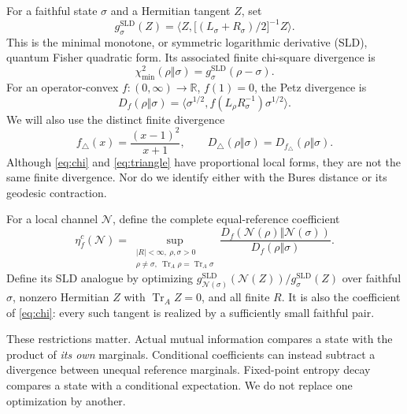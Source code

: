 \documentclass[11pt]{article}
\newcommand{\Tr}{\operatorname{Tr}}
\newcommand{\N}{\mathcal N}
\newcommand{\ip}[2]{\langle #1,#2\rangle}
\newcommand{\Dtri}{D_{\triangle}}
\newcommand{\gmin}{g^{\mathrm{SLD}}}
\theoremstyle{remark}
\begin{document}
For a faithful state \(\sigma\) and a Hermitian tangent \(Z\), set
\begin{equation}\label{eq:sld}
 \gmin_\sigma(Z)=
 \ip{Z}{\bigl[(L_\sigma+R_\sigma)/2\bigr]^{-1}Z}.
\end{equation}
This is the minimal monotone, or symmetric logarithmic derivative (SLD), quantum Fisher quadratic form. Its associated finite chi-square divergence is
\begin{equation}\label{eq:chi}
 \chi^2_{\min}(\rho\Vert\sigma)=\gmin_\sigma(\rho-\sigma).
\end{equation}
For an operator-convex \(f:(0,\infty)\to\mathbb R\), \(f(1)=0\), the Petz divergence is
\begin{equation}\label{eq:petz}
 D_f(\rho\Vert\sigma)=
 \ip{\sigma^{1/2}}{f(L_\rho R_\sigma^{-1})\sigma^{1/2}}.
\end{equation}
We will also use the distinct finite divergence
\begin{equation}\label{eq:triangle}
 f_\triangle(x)=\frac{(x-1)^2}{x+1},\qquad
 \Dtri(\rho\Vert\sigma)=D_{f_\triangle}(\rho\Vert\sigma).
\end{equation}
Although \eqref{eq:chi} and \eqref{eq:triangle} have proportional local forms, they are not the same finite divergence. Nor do we identify either with the Bures distance or its geodesic contraction.

For a local channel \(\N\), define the complete equal-reference coefficient
\begin{equation}\label{eq:complete}
 \eta_f^c(\N)=\sup_{\substack{|R|<\infty,\ \rho,\sigma>0\\
 \rho\ne\sigma,\ \Tr_A\rho=\Tr_A\sigma}}
 \frac{D_f(\N(\rho)\Vert\N(\sigma))}
      {D_f(\rho\Vert\sigma)}.
\end{equation}
Define its SLD analogue by optimizing
\(\gmin_{\N(\sigma)}(\N(Z))/\gmin_\sigma(Z)\)
over faithful \(\sigma\), nonzero Hermitian \(Z\) with \(\Tr_AZ=0\), and all finite \(R\).
It is also the coefficient of \eqref{eq:chi}: every such tangent is realized by a sufficiently small faithful pair.

These restrictions matter. Actual mutual information compares a state with the product of \emph{its own} marginals. Conditional coefficients can instead subtract a divergence between unequal reference marginals. Fixed-point entropy decay compares a state with a conditional expectation. We do not replace one optimization by another.
\end{document}
